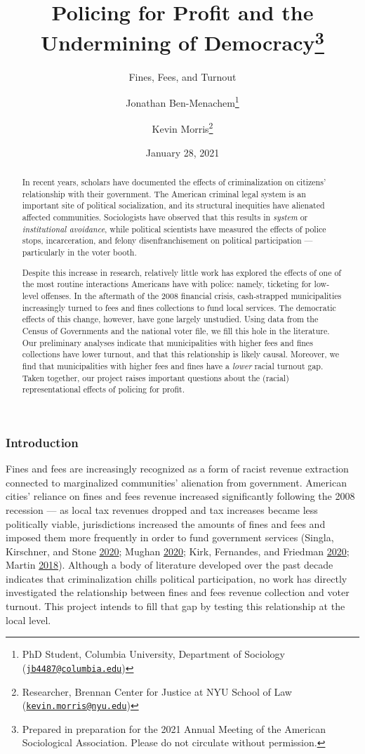 \documentclass[
  12pt,
]{article}
\title{Policing for Profit and the Undermining of Democracy\thanks{Prepared in preparation for the 2021 Annual Meeting of the American Sociological Association. Please do not circulate without permission.}}
\subtitle{Fines, Fees, and Turnout}
\author{Jonathan Ben-Menachem\footnote{PhD Student, Columbia University, Department of Sociology (\href{mailto:jb4487@columbia.edu}{\nolinkurl{jb4487@columbia.edu}})} \and Kevin Morris\footnote{Researcher, Brennan Center for Justice at NYU School of Law (\href{mailto:kevin.morris@nyu.edu}{\nolinkurl{kevin.morris@nyu.edu}})}}
\date{January 28, 2021}
\begin{document}
\maketitle
\begin{abstract}
In recent years, scholars have documented the effects of criminalization on citizens' relationship with their government. The American criminal legal system is an important site of political socialization, and its structural inequities have alienated affected communities. Sociologists have observed that this results in \emph{system} or \emph{institutional avoidance}, while political scientists have measured the effects of police stops, incarceration, and felony disenfranchisement on political participation --- particularly in the voter booth.

Despite this increase in research, relatively little work has explored the effects of one of the most routine interactions Americans have with police: namely, ticketing for low-level offenses. In the aftermath of the 2008 financial crisis, cash-strapped municipalities increasingly turned to fees and fines collections to fund local services. The democratic effects of this change, however, have gone largely unstudied. Using data from the Census of Governments and the national voter file, we fill this hole in the literature. Our preliminary analyses indicate that municipalities with higher fees and fines collections have lower turnout, and that this relationship is likely causal. Moreover, we find that municipalities with higher fees and fines have a \emph{lower} racial turnout gap. Taken together, our project raises important questions about the (racial) representational effects of policing for profit.
\end{abstract}

\pagebreak


\hypertarget{introduction}{%
\subsubsection*{Introduction}\label{introduction}}

Fines and fees are increasingly recognized as a form of racist revenue extraction connected to marginalized communities' alienation from government. American cities' reliance on fines and fees revenue increased significantly following the 2008 recession --- as local tax revenues dropped and tax increases became less politically viable, jurisdictions increased the amounts of fines and fees and imposed them more frequently in order to fund government services (Singla, Kirschner, and Stone \protect\hyperlink{ref-Singla2020}{2020}; Mughan \protect\hyperlink{ref-Mughan2020}{2020}; Kirk, Fernandes, and Friedman \protect\hyperlink{ref-Kirk2020}{2020}; Martin \protect\hyperlink{ref-Martin2018}{2018}). Although a body of literature developed over the past decade indicates that criminalization chills political participation, no work has directly investigated the relationship between fines and fees revenue collection and voter turnout. This project intends to fill that gap by testing this relationship at the local level.
\end{document}
